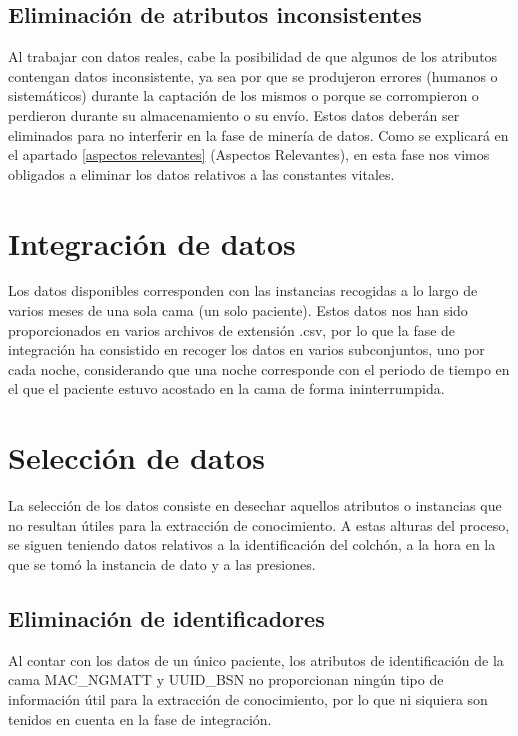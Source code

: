 \subsection{Eliminación de atributos inconsistentes}

Al trabajar con datos reales, cabe la posibilidad de que algunos de los atributos contengan datos inconsistente, ya sea por que se produjeron errores (humanos o sistemáticos) durante la captación de los mismos o porque se corrompieron o perdieron durante su almacenamiento o su envío. Estos datos deberán ser eliminados para no interferir en la fase de minería de datos. Como se explicará en el apartado \ref{aspectos relevantes} (Aspectos Relevantes), en esta fase nos vimos obligados a eliminar los datos relativos a las constantes vitales. 

\section{Integración de datos}

Los datos disponibles corresponden con las instancias recogidas a lo largo de varios meses de una sola cama (un solo paciente). Estos datos nos han sido proporcionados en varios archivos de extensión .csv, por lo que la fase de integración ha consistido en recoger los datos en varios subconjuntos, uno por cada noche, considerando que una noche corresponde con el periodo de tiempo en el que el paciente estuvo acostado en la cama de forma ininterrumpida. 

\section{Selección de datos}

La selección de los datos consiste en desechar aquellos atributos o instancias que no resultan útiles para la extracción de conocimiento. A estas alturas del proceso, se siguen teniendo datos relativos a la identificación del colchón, a la hora en la que se tomó la instancia de dato y a las presiones. 

\subsection{Eliminación de identificadores}

Al contar con los datos de un único paciente, los atributos de identificación de la cama MAC\_NGMATT y UUID\_BSN no proporcionan ningún tipo de información útil para la extracción de conocimiento, por lo que ni siquiera son tenidos en cuenta en la fase de integración. 

